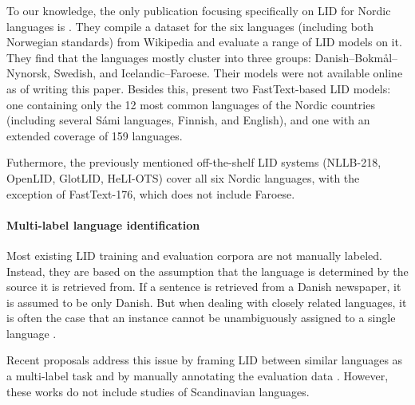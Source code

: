 To our knowledge, the only publication focusing specifically on LID for Nordic languages is . They compile a dataset for the six languages (including both Norwegian standards) from Wikipedia and evaluate a range of LID models on it. They find that the languages mostly cluster into three groups: Danish--Bokmål--Nynorsk, Swedish, and Icelandic--Faroese. Their models were not available online as of writing this paper. Besides this,  present two FastText-based LID models: one containing only the 12 most common languages of the Nordic countries (including several Sámi languages, Finnish, and English), and one with an extended coverage of 159 languages.

Futhermore, the previously mentioned off-the-shelf LID systems (NLLB-218, OpenLID, GlotLID, HeLI-OTS) cover all six Nordic languages, with the exception of FastText-176, which does not include Faroese.


\paragraph{Multi-label language identification}

Most existing LID training and evaluation corpora are not manually labeled. Instead, they are based on the assumption that the language is determined by the source it is retrieved from. If a sentence is retrieved from a Danish newspaper, it is assumed to be only Danish. 
But when dealing with closely related languages, it is often the case that an instance cannot be unambiguously assigned to a single language \citep{goutte-etal-2016-discriminating,keleg-magdy-2023-arabic}.

Recent proposals address this issue by framing LID between similar languages as a multi-label task \citep[e.g.,][]{chifu-etal-2024-vardial,abdul-mageed-etal-2024-nadi} and by manually annotating the evaluation data \citep[e.g.,][]{zampieri-etal-2024-language,miletic-miletic-2024-gold}. However, these works do not include studies of Scandinavian languages.